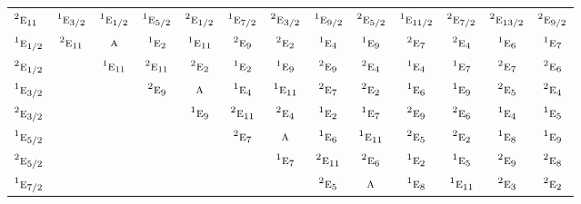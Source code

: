 \documentclass[10pt,a4paper]{article}
\numberwithin{equation}{section}
\newcommand{\irr}[1]{\text{\normalfont\scshape #1}}
\newcommand{\conjpair}[1]{{}^{#1}}
\begin{document}
{\begin{longtable}{@{}lcccccccccccc@{}}
$\conjpair{2}\irr{e}_{11}$ & $\conjpair{1}\irr{e}_{3/2}$ & $\conjpair{1}\irr{e}_{1/2}$ & $\conjpair{1}\irr{e}_{5/2}$ & $\conjpair{2}\irr{e}_{1/2}$ & $\conjpair{1}\irr{e}_{7/2}$ & $\conjpair{2}\irr{e}_{3/2}$ & $\conjpair{1}\irr{e}_{9/2}$ & $\conjpair{2}\irr{e}_{5/2}$ & $\conjpair{1}\irr{e}_{11/2}$ & $\conjpair{2}\irr{e}_{7/2}$ & $\conjpair{2}\irr{e}_{13/2}$ & $\conjpair{2}\irr{e}_{9/2}$\\
$\conjpair{1}\irr{e}_{1/2}$ & $\conjpair{2}\irr{e}_{11}$ & $\irr{a}$ & $\conjpair{1}\irr{e}_{2}$ & $\conjpair{1}\irr{e}_{11}$ & $\conjpair{2}\irr{e}_{9}$ & $\conjpair{2}\irr{e}_{2}$ & $\conjpair{1}\irr{e}_{4}$ & $\conjpair{1}\irr{e}_{9}$ & $\conjpair{2}\irr{e}_{7}$ & $\conjpair{2}\irr{e}_{4}$ & $\conjpair{1}\irr{e}_{6}$ & $\conjpair{1}\irr{e}_{7}$\\
$\conjpair{2}\irr{e}_{1/2}$ &  & $\conjpair{1}\irr{e}_{11}$ & $\conjpair{2}\irr{e}_{11}$ & $\conjpair{2}\irr{e}_{2}$ & $\conjpair{1}\irr{e}_{2}$ & $\conjpair{1}\irr{e}_{9}$ & $\conjpair{2}\irr{e}_{9}$ & $\conjpair{2}\irr{e}_{4}$ & $\conjpair{1}\irr{e}_{4}$ & $\conjpair{1}\irr{e}_{7}$ & $\conjpair{2}\irr{e}_{7}$ & $\conjpair{2}\irr{e}_{6}$\\
$\conjpair{1}\irr{e}_{3/2}$ &  &  & $\conjpair{2}\irr{e}_{9}$ & $\irr{a}$ & $\conjpair{1}\irr{e}_{4}$ & $\conjpair{1}\irr{e}_{11}$ & $\conjpair{2}\irr{e}_{7}$ & $\conjpair{2}\irr{e}_{2}$ & $\conjpair{1}\irr{e}_{6}$ & $\conjpair{1}\irr{e}_{9}$ & $\conjpair{2}\irr{e}_{5}$ & $\conjpair{2}\irr{e}_{4}$\\
$\conjpair{2}\irr{e}_{3/2}$ &  &  &  & $\conjpair{1}\irr{e}_{9}$ & $\conjpair{2}\irr{e}_{11}$ & $\conjpair{2}\irr{e}_{4}$ & $\conjpair{1}\irr{e}_{2}$ & $\conjpair{1}\irr{e}_{7}$ & $\conjpair{2}\irr{e}_{9}$ & $\conjpair{2}\irr{e}_{6}$ & $\conjpair{1}\irr{e}_{4}$ & $\conjpair{1}\irr{e}_{5}$\\
$\conjpair{1}\irr{e}_{5/2}$ &  &  &  &  & $\conjpair{2}\irr{e}_{7}$ & $\irr{a}$ & $\conjpair{1}\irr{e}_{6}$ & $\conjpair{1}\irr{e}_{11}$ & $\conjpair{2}\irr{e}_{5}$ & $\conjpair{2}\irr{e}_{2}$ & $\conjpair{1}\irr{e}_{8}$ & $\conjpair{1}\irr{e}_{9}$\\
$\conjpair{2}\irr{e}_{5/2}$ &  &  &  &  &  & $\conjpair{1}\irr{e}_{7}$ & $\conjpair{2}\irr{e}_{11}$ & $\conjpair{2}\irr{e}_{6}$ & $\conjpair{1}\irr{e}_{2}$ & $\conjpair{1}\irr{e}_{5}$ & $\conjpair{2}\irr{e}_{9}$ & $\conjpair{2}\irr{e}_{8}$\\
$\conjpair{1}\irr{e}_{7/2}$ &  &  &  &  &  &  & $\conjpair{2}\irr{e}_{5}$ & $\irr{a}$ & $\conjpair{1}\irr{e}_{8}$ & $\conjpair{1}\irr{e}_{11}$ & $\conjpair{2}\irr{e}_{3}$ & $\conjpair{2}\irr{e}_{2}$\\

\end{longtable}}
\end{document}
